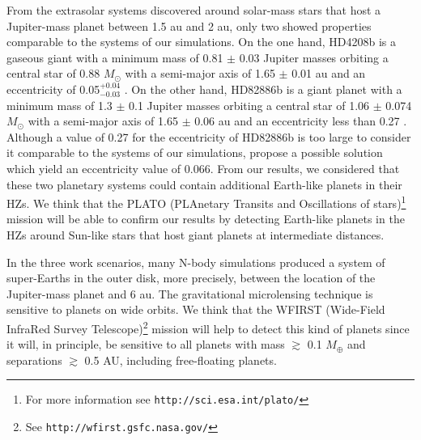 \documentclass{aa}
\begin{document}
From the extrasolar systems discovered around solar-mass stars that host a Jupiter-mass planet between 1.5 au and 2 au, only two showed
properties comparable to the systems of our simulations. On the one hand, HD4208b is a gaseous giant with a minimum mass of
0.81 $\pm$ 0.03 Jupiter masses orbiting a central star of 0.88 $M_{\odot}$ with a semi-major axis of 1.65 $\pm$ 0.01 au and an
eccentricity of 0.05$^{+0.04}_{-0.03}$ \citep{Hollis2012}. On the other hand, HD82886b is a giant planet with a minimum
mass of 1.3 $\pm$ 0.1 Jupiter masses orbiting a central star of 1.06 $\pm$ 0.074 $M_{\odot}$ with a semi-major axis of 1.65 $\pm$ 0.06 au
and an eccentricity less than 0.27 \citep{Johnson2011}. Although a value of 0.27 for the eccentricity of HD82886b is
too large to consider it comparable to the systems of our simulations, \citet{Johnson2011} propose a possible solution which yield an eccentricity value of 0.066.
From our results, we considered that these two planetary systems could contain additional Earth-like planets in their HZs. 
We think that the PLATO (PLAnetary Transits and Oscillations of stars)\footnote{For more information see
\texttt{http://sci.esa.int/plato/}} mission will be able to confirm our results by detecting Earth-like planets in the HZs around Sun-like
stars that host giant planets at intermediate distances.

In the three work scenarios, many N-body simulations produced a system of super-Earths in the outer disk, more precisely,
between the location of the Jupiter-mass planet and 6 au. The gravitational microlensing technique is sensitive to planets
on wide orbits.
We think that the WFIRST (Wide-Field InfraRed Survey Telescope)\footnote{See \texttt{http://wfirst.gsfc.nasa.gov/}}
mission will help to detect this kind of planets since it will, in principle, be sensitive to all planets with mass $\gtrsim$
0.1 $M_{\oplus}$ and separations $\gtrsim$ 0.5 AU, including free-floating planets.
\end{document}
